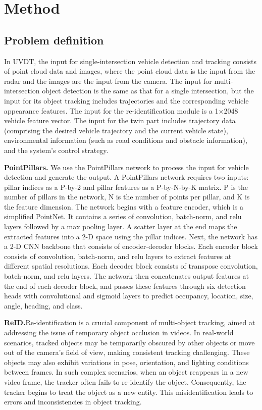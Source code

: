 \section{Method}

\subsection{Problem definition}

In UVDT, the input for single-intersection vehicle detection and tracking consists of point cloud data and images, where the point cloud data is the input from the radar and the images are the input from the camera. 
The input for multi-intersection object detection is the same as that for a single intersection, but the input for its object tracking includes trajectories and the corresponding vehicle appearance features. 
The input for the re-identification module is a 1×2048 vehicle feature vector. 
The input for the twin part includes trajectory data (comprising the desired vehicle trajectory and the current vehicle state), environmental information (such as road conditions and obstacle information), and the system's control strategy.

\textbf{PointPillars.}
We use the PointPillars network to process the input for vehicle detection and generate the output.
A PointPillars network requires two inputs: pillar indices as a P-by-2 and pillar features as a P-by-N-by-K matrix. P is the number of pillars in the network, N is the number of points per pillar, and K is the feature dimension.
The network begins with a feature encoder, which is a simplified PointNet. It contains a series of convolution, batch-norm, and relu layers followed by a max pooling layer. A scatter layer at the end maps the extracted features into a 2-D space using the pillar indices.
Next, the network has a 2-D CNN backbone that consists of encoder-decoder blocks. Each encoder block consists of convolution, batch-norm, and relu layers to extract features at different spatial resolutions. Each decoder block consists of transpose convolution, batch-norm, and relu layers.
The network then concatenates output features at the end of each decoder block, and passes these features through six detection heads with convolutional and sigmoid layers to predict occupancy, location, size, angle, heading, and class.

\textbf{ReID.}Re-identification is a crucial component of multi-object tracking, aimed at addressing the issue of temporary object occlusion in videos. 
In real-world scenarios, tracked objects may be temporarily obscured by other objects or move out of the camera's field of view, making consistent tracking challenging. 
These objects may also exhibit variations in pose, orientation, and lighting conditions between frames. 
In such complex scenarios, when an object reappears in a new video frame, the tracker often fails to re-identify the object. 
Consequently, the tracker begins to treat the object as a new entity. 
This misidentification leads to errors and inconsistencies in object tracking.

